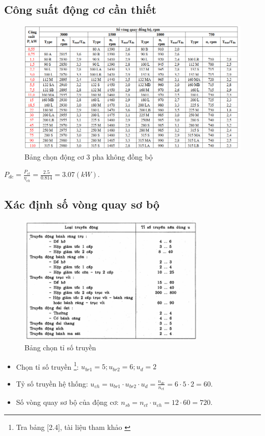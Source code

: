         \subsection{Công suất động cơ cần thiết}
            \begin{figure}[H]
                \centering
                \includegraphics[width=1\textwidth]{pictures/table_2.png}
                \caption{Bảng chọn động cơ 3 pha không đồng bộ}
            \end{figure}
            \begin{center}
                $P_{dc}=\frac{P_{ct}}{\eta_{ch}} = \frac{2.5}{0.814} = 3.07 (kW)$.
            \end{center}
        \subsection{Xác định số vòng quay sơ bộ}
            \begin{figure}[H]
                \centering
                \includegraphics[width=0.8\textwidth]{pictures/table_3.png}
                \caption{Bảng chọn tỉ số truyền}
            \end{figure}
            \begin{itemize}
                \item Chọn tỉ số truyền \footnote{Tra bảng [2.4], tài liệu tham khảo \cite{tltk1} }: $u_{br1} = 5; u_{br2} = 6; u_{d} = 2$\\
                \item Tỷ số truyền hệ thống: $u_{ch}=u_{br1} \cdot u_{br2} \cdot u_{d}=\frac{n_{dc}}{n_{ct}} = 6 \cdot 5 \cdot 2 = 60$.\\
                \item Số vòng quay sơ bộ của động cơ: $n_{sb} = n_{ct} \cdot u_{ch} = 12 \cdot 60 = 720.$
            \end{itemize}
